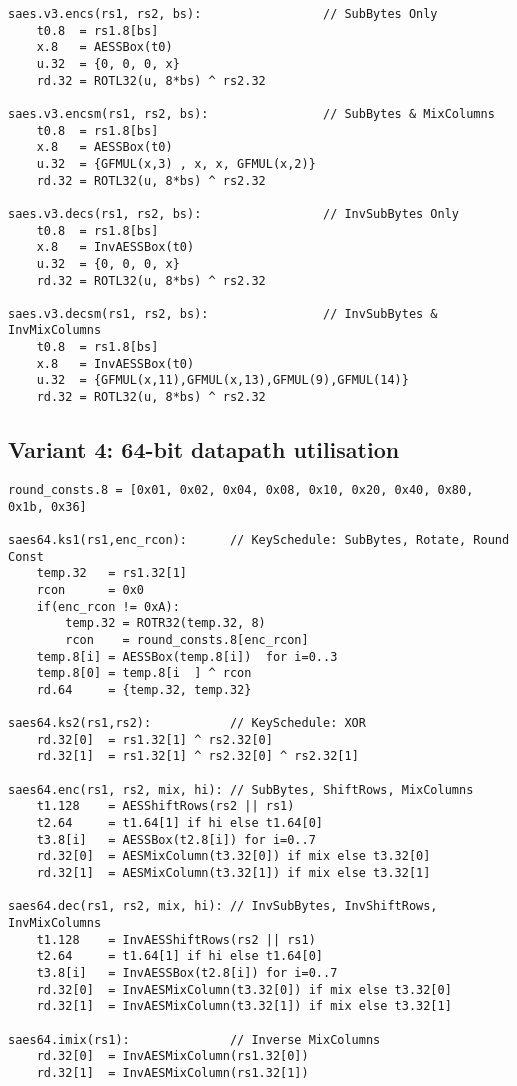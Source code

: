\begin{lstlisting}[language=pseudo]
saes.v3.encs(rs1, rs2, bs):                 // SubBytes Only
    t0.8  = rs1.8[bs]
    x.8   = AESSBox(t0)
    u.32  = {0, 0, 0, x}
    rd.32 = ROTL32(u, 8*bs) ^ rs2.32

saes.v3.encsm(rs1, rs2, bs):                // SubBytes & MixColumns
    t0.8  = rs1.8[bs]
    x.8   = AESSBox(t0)
    u.32  = {GFMUL(x,3) , x, x, GFMUL(x,2)}
    rd.32 = ROTL32(u, 8*bs) ^ rs2.32

saes.v3.decs(rs1, rs2, bs):                 // InvSubBytes Only
    t0.8  = rs1.8[bs]
    x.8   = InvAESSBox(t0)
    u.32  = {0, 0, 0, x}
    rd.32 = ROTL32(u, 8*bs) ^ rs2.32

saes.v3.decsm(rs1, rs2, bs):                // InvSubBytes & InvMixColumns
    t0.8  = rs1.8[bs]
    x.8   = InvAESSBox(t0)
    u.32  = {GFMUL(x,11),GFMUL(x,13),GFMUL(9),GFMUL(14)}
    rd.32 = ROTL32(u, 8*bs) ^ rs2.32
\end{lstlisting}

\subsection{Variant 4: 64-bit datapath utilisation}

\begin{lstlisting}[language=pseudo]
round_consts.8 = [0x01, 0x02, 0x04, 0x08, 0x10, 0x20, 0x40, 0x80, 0x1b, 0x36]

saes64.ks1(rs1,enc_rcon):      // KeySchedule: SubBytes, Rotate, Round Const
    temp.32   = rs1.32[1]
    rcon      = 0x0
    if(enc_rcon != 0xA):
        temp.32 = ROTR32(temp.32, 8)
        rcon    = round_consts.8[enc_rcon]
    temp.8[i] = AESSBox(temp.8[i])  for i=0..3
    temp.8[0] = temp.8[i  ] ^ rcon
    rd.64     = {temp.32, temp.32}

saes64.ks2(rs1,rs2):           // KeySchedule: XOR
    rd.32[0]  = rs1.32[1] ^ rs2.32[0]
    rd.32[1]  = rs1.32[1] ^ rs2.32[0] ^ rs2.32[1]

saes64.enc(rs1, rs2, mix, hi): // SubBytes, ShiftRows, MixColumns
    t1.128    = AESShiftRows(rs2 || rs1)
    t2.64     = t1.64[1] if hi else t1.64[0]
    t3.8[i]   = AESSBox(t2.8[i]) for i=0..7
    rd.32[0]  = AESMixColumn(t3.32[0]) if mix else t3.32[0]
    rd.32[1]  = AESMixColumn(t3.32[1]) if mix else t3.32[1]

saes64.dec(rs1, rs2, mix, hi): // InvSubBytes, InvShiftRows, InvMixColumns
    t1.128    = InvAESShiftRows(rs2 || rs1)
    t2.64     = t1.64[1] if hi else t1.64[0]
    t3.8[i]   = InvAESSBox(t2.8[i]) for i=0..7
    rd.32[0]  = InvAESMixColumn(t3.32[0]) if mix else t3.32[0]
    rd.32[1]  = InvAESMixColumn(t3.32[1]) if mix else t3.32[1]

saes64.imix(rs1):              // Inverse MixColumns
    rd.32[0]  = InvAESMixColumn(rs1.32[0])
    rd.32[1]  = InvAESMixColumn(rs1.32[1])
\end{lstlisting}



